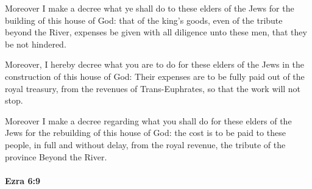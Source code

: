 			\begin{versebox}
					\item[BHS] 
					\item[LXX] 
					\item[ASV] Moreover I make a decree what ye shall do to these elders of the Jews for the building of this house of God: that of the king's goods, even of the tribute beyond the River, expenses be given with all diligence unto these men, that they be not hindered.
					\item[NIV] Moreover, I hereby decree what you are to do for these elders of the Jews in the construction of this house of God: Their expenses are to be fully paid out of the royal treasury, from the revenues of Trans-Euphrates, so that the work will not stop.
					\item[NRSV] Moreover I make a decree regarding what you shall do for these elders of the Jews for the rebuilding of this house of God: the cost is to be paid to these people, in full and without delay, from the royal revenue, the tribute of the province Beyond the River.
			\end{versebox}

		\paragraph{Ezra 6:9} %
			\label{EZRA-6-9}

